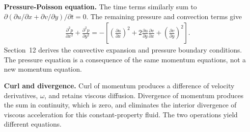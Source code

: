 \textbf{Pressure-Poisson equation.} The time terms similarly sum to $\partial(\partial u/\partial x+\partial v/\partial y)/\partial t=0$. The remaining pressure and convection terms give
\begin{align*}
\frac{\partial^2p}{\partial x^2}+\frac{\partial^2p}{\partial y^2}
=-\left[\left(\frac{\partial u}{\partial x}\right)^2
+2\frac{\partial u}{\partial y}\frac{\partial v}{\partial x}
+\left(\frac{\partial v}{\partial y}\right)^2\right].
\end{align*}
Section~12 derives the convective expansion and pressure boundary conditions. The pressure equation is a consequence of the same momentum equations, not a new momentum equation.

\textbf{Curl and divergence.} Curl of momentum produces a difference of velocity derivatives, $\omega$, and retains viscous diffusion. Divergence of momentum produces the sum in continuity, which is zero, and eliminates the interior divergence of viscous acceleration for this constant-property fluid. The two operations yield different equations.
